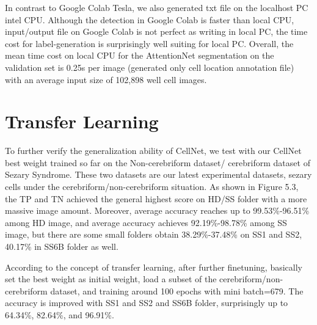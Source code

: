 In contrast to Google Colab Tesla, we also generated txt file on the localhost PC  intel CPU. Although the detection in  Google Colab is faster than local CPU, input/output file on Google Colab is not perfect as writing in local PC, the time cost for label-generation is surprisingly well suiting for local PC. Overall, the mean time cost on local CPU for the AttentionNet segmentation on the validation set is 0.25s per image (generated only cell location annotation file) with an average input size of 102,898 well cell images.


\section{Transfer Learning} %
\label{sub:amet}

To further verify the generalization ability of CellNet, we test with our CellNet best weight trained so far on the Non-cerebriform dataset/ cerebriform dataset of Sezary Syndrome. These two datasets are our latest experimental datasets, sezary cells under the cerebriform/non-cerebriform situation. As shown in Figure 5.3, the TP and TN achieved the general highest score on HD/SS folder with a more massive image amount. Moreover, average accuracy reaches up to 99.53\%-96.51\% among HD image, and average accuracy achieves 92.19\%-98.78\% among SS image, but there are some small folders obtain 38.29\%-37.48\% on SS1 and SS2, 40.17\% in SS6B folder as well. 

According to the concept of transfer learning, after further finetuning, basically set the best weight as initial weight, load a subset of the cerebriform/non-cerebriform dataset, and training around 100 epochs with mini batch=679. The accuracy is improved with SS1 and SS2 and SS6B folder, surprisingly up to 64.34\%, 82.64\%, and 96.91\%.


